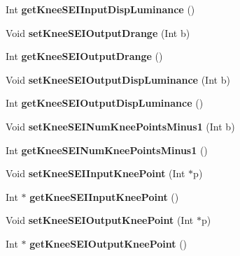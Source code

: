 \begin{DoxyCompactItemize}
\item 
\mbox{\label{class_t_enc_cfg_a2206158d914955395a3cdf93196cb2bf}} 
Int {\bfseries get\+Knee\+S\+E\+I\+Input\+Disp\+Luminance} ()
\item 
\mbox{\label{class_t_enc_cfg_a347c1c1cde089cb7bff4cefdd09d7222}} 
Void {\bfseries set\+Knee\+S\+E\+I\+Output\+Drange} (Int b)
\item 
\mbox{\label{class_t_enc_cfg_abb8375b7f02f960e8e58011e6076b9e3}} 
Int {\bfseries get\+Knee\+S\+E\+I\+Output\+Drange} ()
\item 
\mbox{\label{class_t_enc_cfg_a76353504385cf085e9e0e9184e027d98}} 
Void {\bfseries set\+Knee\+S\+E\+I\+Output\+Disp\+Luminance} (Int b)
\item 
\mbox{\label{class_t_enc_cfg_ad0f621145d5d62820ed1df1a863401fb}} 
Int {\bfseries get\+Knee\+S\+E\+I\+Output\+Disp\+Luminance} ()
\item 
\mbox{\label{class_t_enc_cfg_a86aecae494c68ad09e9ac4918b01df5b}} 
Void {\bfseries set\+Knee\+S\+E\+I\+Num\+Knee\+Points\+Minus1} (Int b)
\item 
\mbox{\label{class_t_enc_cfg_a2d81f55b03d8b4e3bc1baff0ff6733ed}} 
Int {\bfseries get\+Knee\+S\+E\+I\+Num\+Knee\+Points\+Minus1} ()
\item 
\mbox{\label{class_t_enc_cfg_a114a5f9cf3808cacedb3da5b1f0e76be}} 
Void {\bfseries set\+Knee\+S\+E\+I\+Input\+Knee\+Point} (Int $\ast$p)
\item 
\mbox{\label{class_t_enc_cfg_aebb8742d8a84f77bb9950543322b2c53}} 
Int $\ast$ {\bfseries get\+Knee\+S\+E\+I\+Input\+Knee\+Point} ()
\item 
\mbox{\label{class_t_enc_cfg_a083440dc2f374f72ef80fbbd44039d50}} 
Void {\bfseries set\+Knee\+S\+E\+I\+Output\+Knee\+Point} (Int $\ast$p)
\item 
\mbox{\label{class_t_enc_cfg_a9cccf24dbc726fbeb39b6bfbdd9ab0f5}} 
Int $\ast$ {\bfseries get\+Knee\+S\+E\+I\+Output\+Knee\+Point} ()

\end{DoxyCompactItemize}
